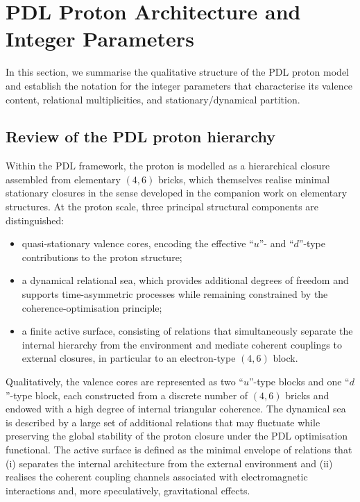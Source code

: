 \documentclass[11pt,a4paper]{article}
\theoremstyle{definition}
\begin{document}
\section{PDL Proton Architecture and Integer Parameters}
\label{sec:proton_architecture}

In this section, we summarise the qualitative structure of the PDL proton model and establish the notation for the integer parameters that characterise its valence content, relational multiplicities, and stationary/dynamical partition.\cite{PDL_Main_2026,PDL_Intro_2026,Combinatorial_Proton_v2_2026,PDL_Global_Mapping_2026}

\subsection{Review of the PDL proton hierarchy}

Within the PDL framework, the proton is modelled as a hierarchical closure assembled from elementary $(4,6)$ bricks, which themselves realise minimal stationary closures in the sense developed in the companion work on elementary structures.\cite{PDL_Main_2026,Combinatorial_Proton_v2_2026} At the proton scale, three principal structural components are distinguished:
\begin{itemize}
  \item quasi-stationary valence cores, encoding the effective ``$u$''- and ``$d$''-type contributions to the proton structure;
  \item a dynamical relational sea, which provides additional degrees of freedom and supports time-asymmetric processes while remaining constrained by the coherence-optimisation principle;
  \item a finite active surface, consisting of relations that simultaneously separate the internal hierarchy from the environment and mediate coherent couplings to external closures, in particular to an electron-type $(4,6)$ block.\cite{PDL_Main_2026,Combinatorial_Proton_v2_2026,Effective_Fields_PDL_2026}
\end{itemize}

Qualitatively, the valence cores are represented as two ``$u$''-type blocks and one ``$d$''-type block, each constructed from a discrete number of $(4,6)$ bricks and endowed with a high degree of internal triangular coherence.\cite{Combinatorial_Proton_v2_2026} The dynamical sea is described by a large set of additional relations that may fluctuate while preserving the global stability of the proton closure under the PDL optimisation functional.\cite{PDL_Main_2026,PDL_Global_Mapping_2026} The active surface is defined as the minimal envelope of relations that (i) separates the internal architecture from the external environment and (ii) realises the coherent coupling channels associated with electromagnetic interactions and, more speculatively, gravitational effects.\cite{Effective_Fields_PDL_2026,Alpha_PDL_v2_2026}
\end{document}
